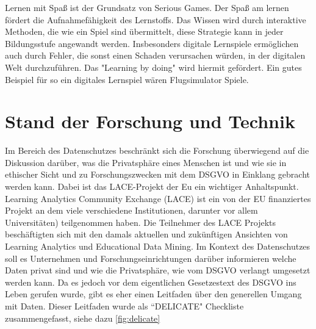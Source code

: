 \documentclass[a4paper, 12pt]{article}
\begin{document}
Lernen mit Spaß ist der Grundsatz von Serious Games. Der Spaß am lernen fördert die Aufnahmefähigkeit des Lernstoffs. Das Wissen wird durch interaktive Methoden, die wie ein Spiel sind übermittelt, diese Strategie kann in jeder Bildungsstufe angewandt werden. 
Insbesonders digitale Lernspiele ermöglichen auch durch Fehler, die sonst einen Schaden verursachen würden, in der digitalen Welt durchzuführen. Das "Learning by doing" wird hiermit gefördert. Ein gutes Beispiel für so ein digitales Lernspiel wären Flugsimulator Spiele.
\newpage
\section{Stand der Forschung und Technik}
Im Bereich des Datenschutzes beschränkt sich die Forschung überwiegend auf die Diskussion darüber, was die Privatsphäre eines Menschen ist und wie sie in ethischer Sicht und zu Forschungszwecken mit dem DSGVO in Einklang gebracht werden kann. Dabei ist das LACE-Projekt der Eu ein wichtiger Anhaltspunkt\cite{lace_allgemein}. Learning Analytics Community Exchange (LACE) ist ein von der EU finanziertes Projekt an dem viele verschiedene Institutionen, darunter vor allem Universitäten) teilgenommen haben. Die Teilnehmer des LACE Projekts beschäftigten sich mit den damals aktuellen und zukünftigen Ansichten von Learning Analytics und Educational Data Mining. Im Kontext des Datenschutzes soll es Unternehmen und Forschungseinrichtungen darüber informieren welche Daten privat sind und wie die Privatsphäre, wie vom DSGVO verlangt umgesetzt werden kann. Da es jedoch vor dem eigentlichen Gesetzestext des DSGVO ins Leben gerufen wurde, gibt es eher einen Leitfaden über den generellen Umgang mit Daten. Dieser Leitfaden wurde als ``DELICATE" Checkliste zusammengefasst, siehe dazu \autoref{fig:delicate}\\
\end{document}
